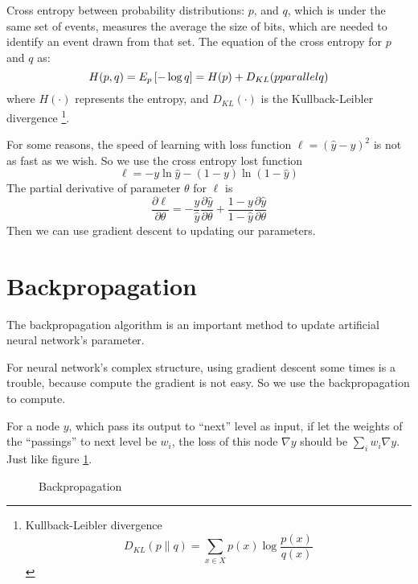 \documentclass{article}
\begin{document}
Cross entropy between probability distributions: $p$, and $q$, which is under the same set of events, measures the average
the size of bits, which are needed to identify an event drawn from that set.
The equation of the cross entropy for $p$ and $q$ as:
\[
H(p,q) = E_p\left[-\log{q}\right] = H(p) + D_{KL}(p\\parallel q)
\] 
where $H(\cdot)$ represents the entropy, and $D_{KL}(\cdot)$ is the Kullback-Leibler divergence%
\footnote{ Kullback-Leibler divergence
	\[
	D_{KL}(p\parallel q) = \sum\limits_{x \in X}p(x)\log\frac{p(x)}{q(x)}
	\]
}.

For some reasons, the speed of learning with loss function $\ell = (\hat{y}-y)^2$ is not as fast as we wish.
So we use the cross entropy lost function
\[
\ell = - y\ln{\hat{y}}-(1-y)\ln{(1-\hat{y})}
\]
The partial derivative of parameter $\theta$ for $\ell$ is 
\[
\frac{\partial \ell}{\partial \theta} = - \frac{y}{\hat{y}}\frac{\partial\hat{y}}{\partial\theta} + \frac{1-y}{1-\hat{y}}\frac{\partial\hat{y}}{\partial \theta}
\] 
Then we can use gradient descent to updating our parameters.


\section{Backpropagation}
\label{sec:bp}

The backpropagation algorithm is an important method to update artificial neural network's parameter. 

For neural network's complex structure, using gradient descent some times is a trouble, because
compute the gradient is not easy. So we use the backpropagation to compute.

For a node $y$, which pass its output to ``next'' level as input,
if let the weights of the ``passings'' to next level be $w_i$, the 
loss of this node $\nabla y$ should be $\sum\limits_{i}w_i\nabla y$.
Just like figure \ref{fig:bp:1}.

\begin{figure}
    \centering
    \caption{Backpropagation}
    \label{fig:bp:1}
\end{figure}
\end{document}

